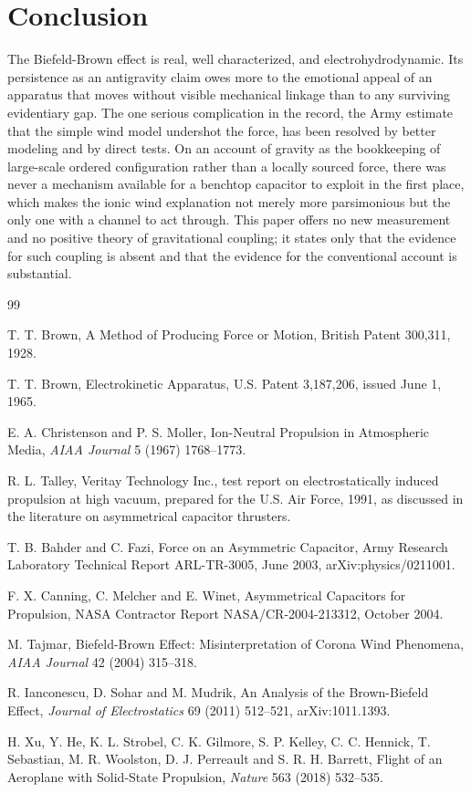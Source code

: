 \documentclass[11pt]{article}
\begin{document}
\section{Conclusion}

The Biefeld-Brown effect is real, well characterized, and electrohydrodynamic. Its persistence as an antigravity claim owes more to the emotional appeal of an apparatus that moves without visible mechanical linkage than to any surviving evidentiary gap. The one serious complication in the record, the Army estimate that the simple wind model undershot the force, has been resolved by better modeling and by direct tests. On an account of gravity as the bookkeeping of large-scale ordered configuration rather than a locally sourced force, there was never a mechanism available for a benchtop capacitor to exploit in the first place, which makes the ionic wind explanation not merely more parsimonious but the only one with a channel to act through. This paper offers no new measurement and no positive theory of gravitational coupling; it states only that the evidence for such coupling is absent and that the evidence for the conventional account is substantial.

\begin{thebibliography}{99}

 T. T. Brown, A Method of Producing Force or Motion, British Patent 300,311, 1928.

 T. T. Brown, Electrokinetic Apparatus, U.S. Patent 3,187,206, issued June 1, 1965.

 E. A. Christenson and P. S. Moller, Ion-Neutral Propulsion in Atmospheric Media, \emph{AIAA Journal} 5 (1967) 1768--1773.

 R. L. Talley, Veritay Technology Inc., test report on electrostatically induced propulsion at high vacuum, prepared for the U.S. Air Force, 1991, as discussed in the literature on asymmetrical capacitor thrusters.

 T. B. Bahder and C. Fazi, Force on an Asymmetric Capacitor, Army Research Laboratory Technical Report ARL-TR-3005, June 2003, arXiv:physics/0211001.

 F. X. Canning, C. Melcher and E. Winet, Asymmetrical Capacitors for Propulsion, NASA Contractor Report NASA/CR-2004-213312, October 2004.

 M. Tajmar, Biefeld-Brown Effect: Misinterpretation of Corona Wind Phenomena, \emph{AIAA Journal} 42 (2004) 315--318.

 R. Ianconescu, D. Sohar and M. Mudrik, An Analysis of the Brown-Biefeld Effect, \emph{Journal of Electrostatics} 69 (2011) 512--521, arXiv:1011.1393.

 H. Xu, Y. He, K. L. Strobel, C. K. Gilmore, S. P. Kelley, C. C. Hennick, T. Sebastian, M. R. Woolston, D. J. Perreault and S. R. H. Barrett, Flight of an Aeroplane with Solid-State Propulsion, \emph{Nature} 563 (2018) 532--535.

\end{thebibliography}
\end{document}
